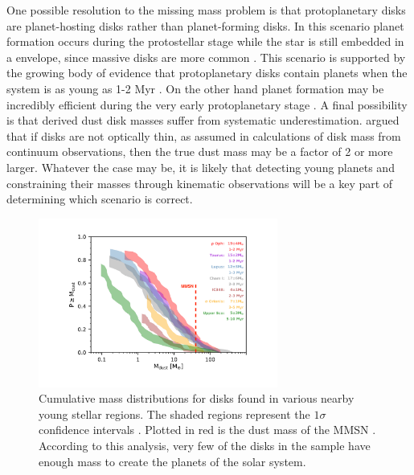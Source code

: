 One possible resolution to the missing mass problem is that protoplanetary disks are planet-hosting disks rather than planet-forming disks.
In this scenario planet formation occurs during the protostellar stage while the star is still embedded in a envelope, since massive disks are more common \citep{greaves2010}.
This scenario is supported by the growing body of evidence that protoplanetary disks contain planets when the system is as young as 1-2 Myr \citep{almapartnership2015,zhang2018,verrios2022}.
On the other hand planet formation may be incredibly efficient during the very early protoplanetary stage \citep{najita2014,manara2018,Tychoniec2020}.
A final possibility is that derived dust disk masses suffer from systematic underestimation. 
\citet{zhu2019} argued that if disks are not optically thin, as assumed in calculations of disk mass from continuum observations, then the true dust mass may be a factor of 2 or more larger.
Whatever the case may be, it is likely that detecting young planets and constraining their masses through kinematic observations will be a key part of determining which scenario is correct.

\begin{figure}
    \centering
    \includegraphics[width = 0.7\textwidth]{figures/disk_mass.pdf}
    \caption{Cumulative mass distributions for disks found in various nearby young stellar regions. The shaded regions represent the $1\sigma$ confidence intervals \citep{vanterwisga2019}. Plotted in red is the dust mass of the MMSN \citep{weidenschilling1977b}. According to this analysis, very few of the disks in the sample have enough mass to create the planets of the solar system.}
    \label{fig:disk_masses}
\end{figure}